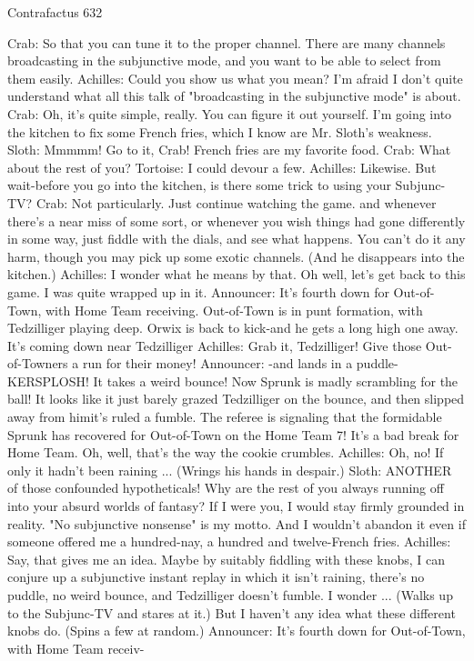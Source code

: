 Contrafactus                                                                             632

Crab: So that you can tune it to the proper channel. There are many channels
   broadcasting in the subjunctive mode, and you want to be able to select from them
   easily.
Achilles: Could you show us what you mean? I'm afraid I don't quite understand what all
   this talk of "broadcasting in the subjunctive mode" is about.
Crab: Oh, it's quite simple, really. You can figure it out yourself. I'm going into the
   kitchen to fix some French fries, which I know are Mr. Sloth's weakness.
Sloth: Mmmmm! Go to it, Crab! French fries are my favorite food. Crab: What about the
   rest of you?
Tortoise: I could devour a few.
Achilles: Likewise. But wait-before you go into the kitchen, is there some trick to using
   your Subjunc-TV?
Crab: Not particularly. Just continue watching the game. and whenever there's a near
   miss of some sort, or whenever you wish things had gone differently in some way, just
   fiddle with the dials, and see what happens. You can't do it any harm, though you may
   pick up some exotic channels. (And he disappears into the kitchen.)
Achilles: I wonder what he means by that. Oh well, let's get back to this game. I was
   quite wrapped up in it.
Announcer: It's fourth down for Out-of-Town, with Home Team receiving. Out-of-Town
   is in punt formation, with Tedzilliger playing deep. Orwix is back to kick-and he gets
   a long high one away. It's coming down near Tedzilliger
Achilles: Grab it, Tedzilliger! Give those Out-of-Towners a run for their money!
Announcer: -and lands in a puddle-KERSPLOSH! It takes a weird bounce! Now Sprunk
   is madly scrambling for the ball! It looks like it just barely grazed Tedzilliger on the
   bounce, and then slipped away from himit's ruled a fumble. The referee is signaling
   that the formidable Sprunk has recovered for Out-of-Town on the Home Team 7! It's a
   bad break for Home Team. Oh, well, that's the way the cookie crumbles.
Achilles: Oh, no! If only it hadn't been raining ... (Wrings his hands in despair.)
Sloth: ANOTHER of those confounded hypotheticals! Why are the rest of you always
   running off into your absurd worlds of fantasy? If I were you, I would stay firmly
   grounded in reality. "No subjunctive nonsense" is my motto. And I wouldn't abandon
   it even if someone offered me a hundred-nay, a hundred and twelve-French fries.
Achilles: Say, that gives me an idea. Maybe by suitably fiddling with these knobs, I can
   conjure up a subjunctive instant replay in which it isn't raining, there's no puddle, no
   weird bounce, and Tedzilliger doesn't
fumble. I wonder ... (Walks up to the Subjunc-TV and stares at it.) But I haven't any idea
   what these different knobs do. (Spins a few at random.)
Announcer: It's fourth down for Out-of-Town, with Home Team receiv-




